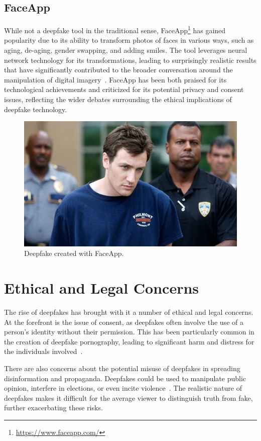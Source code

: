 \subsection{FaceApp}\label{sec:faceapp}
While not a deepfake tool in the traditional sense,
FaceApp\footnote{\url{https://www.faceapp.com/}} has gained popularity due
to its ability to transform photos of faces in various ways, such as aging,
de-aging, gender swapping, and adding smiles. The tool leverages neural
network technology for its transformations, leading to surprisingly
realistic results that have significantly contributed to the broader conversation
around the manipulation of digital imagery~\cite{faceapp}. FaceApp has
been both praised for its technological achievements and criticized for
its potential privacy and consent issues, reflecting the wider debates
surrounding the ethical implications of deepfake technology.

\begin{figure}[ht]
	\centering
	\includegraphics[width=0.61\columnwidth]{figures/faceapp}
	\caption{Deepfake created with FaceApp.} %
\end{figure}


\section{Ethical and Legal Concerns}\label{chapter:legal}
The rise of deepfakes has brought with it a number of ethical and legal concerns.
At the forefront is the issue of consent, as deepfakes often involve the
use of a person's identity without their permission. This has been
particularly common in the creation of deepfake pornography, leading
to significant harm and distress for the individuals involved~\cite{chesney2019deep}.

There are also concerns about the potential misuse of deepfakes in spreading
disinformation and propaganda. Deepfakes could be used to manipulate public
opinion, interfere in elections, or even incite violence~\cite{deepfakes-business-insider,partnershiponai}.
The realistic nature of deepfakes makes it difficult for the average viewer
to distinguish truth from fake, further exacerbating these risks.

